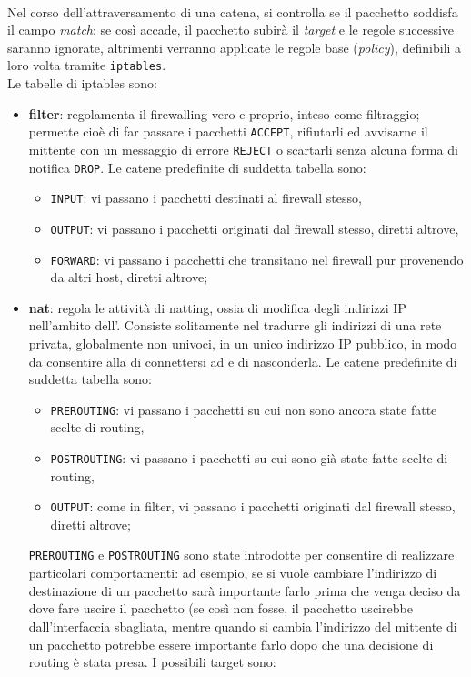\documentclass[a4paper, twoside]{article}
\def\code#1{\texttt{#1}}
\def\vedi#1{\nameref{#1}}
\begin{document}
\\Nel corso dell'attraversamento di una catena, si controlla se il pacchetto soddisfa il campo \textit{match}: se così accade, il pacchetto subirà il \textit{target} e le regole successive saranno ignorate, altrimenti verranno applicate le regole base (\textit{policy}), definibili a loro volta tramite \code{iptables}.\\
Le tabelle di iptables sono:
\begin{itemize}
\item \textbf{filter}: regolamenta il firewalling vero e proprio, inteso come filtraggio; permette cioè di far passare i pacchetti \code{ACCEPT}, rifiutarli ed avvisarne il mittente con un messaggio di errore \code{REJECT} o scartarli senza alcuna forma di notifica \code{DROP}.
Le catene predefinite di suddetta tabella sono:
\begin{itemize}
\item \code{INPUT}: vi passano i pacchetti destinati al firewall stesso,
\item \code{OUTPUT}: vi passano i pacchetti originati dal firewall stesso, diretti altrove,
\item \code{FORWARD}: vi passano i pacchetti che transitano nel firewall pur provenendo da altri host, diretti altrove;
\end{itemize}
\item \textbf{nat}: regola le attività di natting, ossia di modifica degli indirizzi IP nell'ambito dell'\vedi{Oscuramento}. Consiste solitamente nel tradurre gli indirizzi di una rete privata, globalmente non univoci, in un unico indirizzo IP pubblico, in modo da consentire alla \vedi{LAN} di connettersi ad \vedi{Internet} e di nasconderla. Le catene predefinite di suddetta tabella sono: \label{NAT}
\begin{itemize}
\item \code{PREROUTING}: vi passano i pacchetti su cui non sono ancora state fatte scelte di routing,
\item \code{POSTROUTING}: vi passano i pacchetti su cui sono già state fatte scelte di routing,
\item \code{OUTPUT}: come in filter, vi passano i pacchetti originati dal firewall stesso, diretti altrove;
\end{itemize}
\code{PREROUTING} e \code{POSTROUTING} sono state introdotte per consentire di realizzare particolari comportamenti: ad esempio, se si vuole cambiare l’indirizzo di destinazione di un pacchetto sarà importante farlo prima che venga deciso da dove fare uscire il pacchetto (se così non fosse, il pacchetto uscirebbe dall’interfaccia sbagliata, mentre quando si cambia l'indirizzo del mittente di un pacchetto potrebbe essere importante farlo dopo che una decisione di routing è stata presa. I possibili target sono:

\end{itemize}
\end{document}
